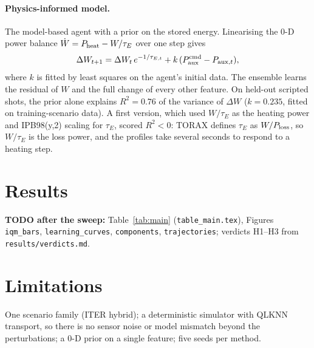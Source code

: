 \documentclass[11pt]{article}
\begin{document}
\paragraph{Physics-informed model.} The model-based agent with a prior on the stored energy. Linearising the
0-D power balance $\dot W = P_{\rm heat} - W/\tau_E$ over one step gives
\begin{equation}
\Delta W_{t+1} = \Delta W_t\, e^{-1/\tau_{E,t}} + k\,(P^{\rm cmd}_{\rm aux} - P_{{\rm aux},t}),
\end{equation}
where $k$ is fitted by least squares on the agent's initial data. The ensemble learns the residual of $W$ and
the full change of every other feature. On held-out scripted shots, the prior alone explains $R^2=0.76$ of the
variance of $\Delta W$ ($k=0.235$, fitted on training-scenario data). A first version, which used $W/\tau_E$ as the
heating power and IPB98(y,2) scaling for $\tau_E$, scored $R^2<0$: TORAX defines $\tau_E$ as $W/P_{\rm loss}$, so
$W/\tau_E$ is the loss power, and the profiles take several seconds to respond to a heating step.

\section{Results}
\textbf{TODO after the sweep:} Table~\ref{tab:main} (\texttt{table\_main.tex}), Figures \texttt{iqm\_bars},
\texttt{learning\_curves}, \texttt{components}, \texttt{trajectories}; verdicts H1--H3 from
\texttt{results/verdicts.md}.

\section{Limitations}
One scenario family (ITER hybrid); a deterministic simulator with QLKNN transport, so there is no sensor noise or
model mismatch beyond the perturbations; a 0-D prior on a single feature; five seeds per method.



\end{document}
